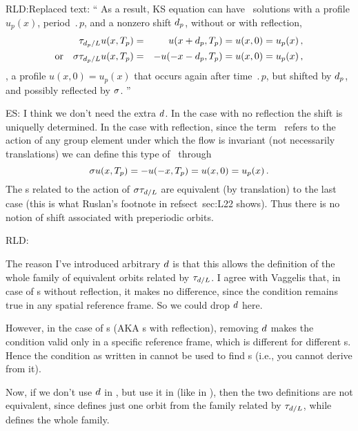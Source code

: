 \medskip

RLD:{Replaced text: ``
As a result, KS equation can have
\rpo\ solutions with a profile $u_p(x)$, period $\period{p}$, and a
nonzero shift $d_p$, without or with reflection,
\begin{eqnarray}
  \tau_{d_p/L}u(x,{T_{p}}) &=&
  u(x+d_p,{T_{p}}) = u(x,0) = u_p(x)\,,
\label{KSrpos0} \\
  \mbox{or} \quad \sigma\tau_{d_p/L} u(x,{T_{p}}) &=&
  -u(-x-d_p,{T_{p}}) = u(x,0) = u_p(x)\,,
\label{KSpos0}
\end{eqnarray}
\ie, a profile $u(x,0) = u_p(x)$ that occurs again after time
$\period{p}$, but shifted by $d_p$, and possibly reflected by
$\sigma$.
   ''}

ES:{ I think we don't need the extra $d$. In the case with no reflection
the shift is uniquelly determined. In the case with reflection, since the term \rpo\
refers to the action of any group element under which the flow is invariant (not
necessarily translations) we can define this type of \rpo\ through
\[
  \sigma u(x,{T_{p}}) =
  -u(-x,{T_{p}}) = u(x,0) = u_p(x)\,.
\]
The \rpo s related to the action of $\sigma\tau_{d/L}$ are equivalent (by translation) to
the last case (this is what Ruslan's footnote in refsect~{sec:L22} shows). Thus
there is no notion of shift associated with preperiodic orbits.
} %

RLD:{
The reason I've introduced arbitrary $d$ is that this allows
the definition of the whole family of equivalent orbits related
by $\tau_{d/L}$.  I agree with Vaggelis that, in case of \rpo s
without reflection, it makes no difference, since the condition
 remains true in any spatial reference frame.  So we could
drop $d$ here.

However, in the case of \po s (AKA \rpo s with reflection),
removing $d$ makes the condition  valid only in
a specific reference frame, which is different for different \po s.
Hence the condition as written in \refeq{KSpos} cannot be used to
find \po s (i.e., you cannot derive \refeq{KSposFour} from it).

Now, if we don't use $d$ in , but use it in 
(like in \refeq{KSpos1}), then the two definitions are not equivalent,
since \refeq{KSrpos} defines just one orbit from the family related
by $\tau_{d/L}$, while \refeq{KSpos1} defines the whole family.
   } %

